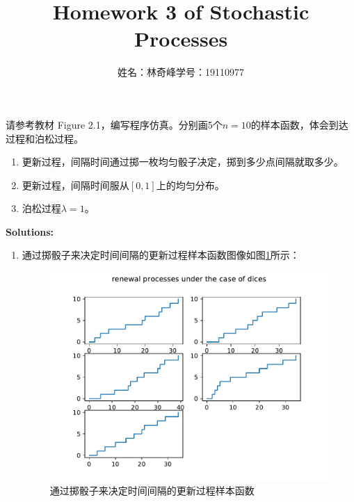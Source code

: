 \documentclass{article}
\begin{document}
    \title{Homework 3 of Stochastic Processes}
    \author{姓名：林奇峰\qquad 学号：19110977}
    \maketitle

    请参考教材 Figure 2.1，编写程序仿真。分别画5个$n=10$的样本函数，体会到达过程和泊松过程。
    \begin{enumerate}[1)]
        \item 更新过程，间隔时间通过掷一枚均匀骰子决定，掷到多少点间隔就取多少。
        \item 更新过程，间隔时间服从$[0,1]$上的均匀分布。
        \item 泊松过程$\lambda=1$。  
    \end{enumerate}

    \noindent\textbf{Solutions:}

    \begin{enumerate}[1)]
        \item 通过掷骰子来决定时间间隔的更新过程样本函数图像如图\ref{fig:dices}所示：
            \begin{figure}[h]
                \centering
                \includegraphics[width=6.0in]{dices.pdf}
                \caption{通过掷骰子来决定时间间隔的更新过程样本函数}
                \label{fig:dices}
            \end{figure}
    \end{enumerate}
\end{document}
